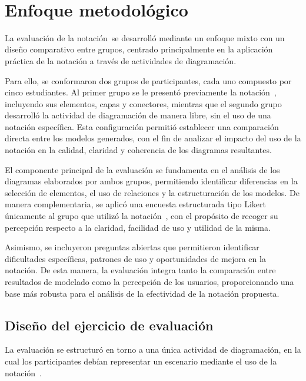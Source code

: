 \FloatBarrier

\label{cap:pmv}
\mbox{}\\

\section{Enfoque metodológico}
\noindent
La evaluación de la notación~\NDITI se desarrolló mediante un enfoque mixto con un diseño comparativo entre grupos, centrado principalmente en la aplicación práctica de la notación a través de actividades de diagramación.

Para ello, se conformaron dos grupos de participantes, cada uno compuesto por cinco estudiantes. Al primer grupo se le presentó previamente la notación~\NDITI{}, incluyendo sus elementos, capas y conectores, mientras que el segundo grupo desarrolló la actividad de diagramación de manera libre, sin el uso de una notación específica. Esta configuración permitió establecer una comparación directa entre los modelos generados, con el fin de analizar el impacto del uso de la notación en la calidad, claridad y coherencia de los diagramas resultantes.

El componente principal de la evaluación se fundamenta en el análisis de los diagramas elaborados por ambos grupos, permitiendo identificar diferencias en la selección de elementos, el uso de relaciones y la estructuración de los modelos. De manera complementaria, se aplicó una encuesta estructurada tipo Likert únicamente al grupo que utilizó la notación~\NDITI{}, con el propósito de recoger su percepción respecto a la claridad, facilidad de uso y utilidad de la misma.

Asimismo, se incluyeron preguntas abiertas que permitieron identificar dificultades específicas, patrones de uso y oportunidades de mejora en la notación. De esta manera, la evaluación integra tanto la comparación entre resultados de modelado como la percepción de los usuarios, proporcionando una base más robusta para el análisis de la efectividad de la notación propuesta.

\subsection{Diseño del ejercicio de evaluación}
\noindent
La evaluación se estructuró en torno a una única actividad de diagramación, en la cual los participantes debían representar un escenario mediante el uso de la notación~\NDITI.

